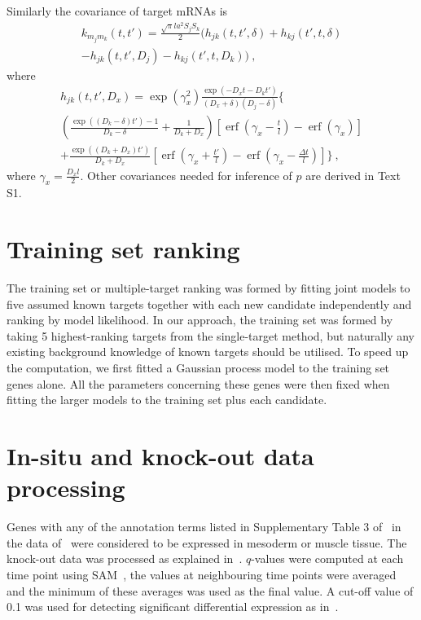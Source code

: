 \documentclass{pnastwo}
\newcommand{\erf}{\operatorname{erf}}
\begin{document}
\begin{article}
\begin{materials}
  Similarly the covariance of target mRNAs is
  \begin{multline*}
    k_{m_j m_k}(t, t')
    = \frac{\sqrt{\pi} l a^2 S_j S_k}{2} \bigg(
    h_{jk}(t, t', \delta) + h_{kj}(t', t, \delta) \\
    - h_{jk}(t, t', D_j) - h_{kj}(t', t, D_k)
    \bigg)\ ,
  \end{multline*}
  where
  \begin{multline*}
    h_{jk}(t, t', D_x) = 
    \exp\left(\gamma_x^2\right)
    \frac{\exp(-D_x t - D_k t')}{(D_x + \delta) (D_j - \delta)}
    \bigg\{ 
    \\
    \left(\frac{\exp((D_k-\delta) t') - 1}{D_k-\delta} +
      \frac{1}{D_k + D_x} \right)
    \left[\erf\left(\gamma_x - \frac{t}{l}\right) - \erf\left(\gamma_x\right)\right]
    \\
    + \frac{\exp((D_k+D_x)t')}{D_k+D_x}
    \left[\erf\left(\gamma_x + \frac{t'}{l}\right)
    - \erf\left(\gamma_x - \frac{\Delta t}{l}\right)\right]
    \bigg\}\ ,
  \end{multline*}
  where $\gamma_x = \frac{D_x l}{2}$.
  Other covariances needed for inference of $p$ are derived in Text S1.

  \section{Training set ranking}
  The training set or multiple-target ranking was formed by fitting
  joint models to five assumed known targets together with each new
  candidate independently and ranking by model likelihood.  In our
  approach, the training set was formed by taking 5 highest-ranking
  targets from the single-target method, but naturally any existing background
  knowledge of known targets should be utilised.  To speed up the
  computation, we first fitted a Gaussian process model to the
  training set genes alone.  All the parameters concerning these genes
  were then fixed when fitting the larger models to the training set
  plus each candidate.

  \section{In-situ and knock-out data processing}
  Genes with any of the annotation terms listed in Supplementary Table
  3 of~\cite{Zinzen2009} in the data of~\cite{Tomancak2002} were
  considered to be expressed in mesoderm or muscle tissue.
  The knock-out data was processed as explained
  in~\cite{Sandmann2006a}.  $q$-values were computed at each time
  point using SAM~\cite{Saeed2003,Tusher2001}, the values at
  neighbouring time points were averaged and the minimum of these
  averages was used as the final value.  A cut-off value of 0.1 was
  used for detecting significant differential expression as
  in~\cite{Sandmann2006a}.


\end{materials}
\end{article}
\end{document}
